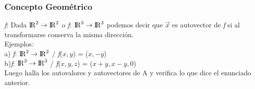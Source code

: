 \documentclass{article}
\begin{document}
\subsubsection{Concepto Geométrico}
\textit{f}: Dada ${\rm I\!R}^{2}\rightarrow {\rm I\!R}^{2}$ o \textit{f}: ${\rm I\!R}^{3}\rightarrow {\rm I\!R}^{3}$ podemos decir que $\vec{x}$ es autovector de \textit{f} si al transformarse conserva la misma dirección.\\
Ejemplos:\\
a) \textit{f}: ${\rm I\!R}^{2}\rightarrow {\rm I\!R}^{2}$ / \textit{f}($x,y$) = ($x, -y$)\\
b)\textit{f}: ${\rm I\!R}^{3}\rightarrow {\rm I\!R}^{3}$ / \textit{f}($x,y,z$) = ($x+y, x-y, 0$)\\
Luego halla los autovalores y autovectores de A y verifica lo que dice el enunciado anterior.\\
\newpage
\end{document}
